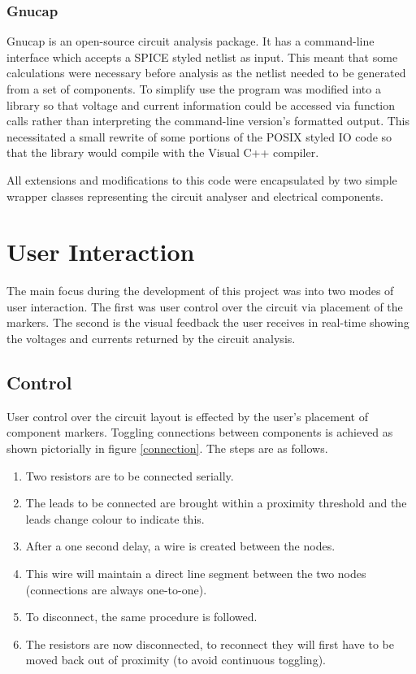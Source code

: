 \subsubsection{Gnucap}
Gnucap is an open-source circuit analysis package. It has a command-line
interface which accepts a SPICE styled netlist as input. This meant that some
calculations were necessary before analysis as the netlist needed to be generated
from a set of components. To simplify use the program was modified into a
library so that voltage and current information could be accessed via function
calls rather than interpreting the command-line version's formatted output. This
necessitated a small rewrite of some portions of the POSIX styled IO code so
that the library would compile with the Visual C++ compiler.

All extensions and modifications to this code were encapsulated by two simple
wrapper classes representing the circuit analyser and electrical components.

\section{User Interaction}
The main focus during the development of this project was into two modes of user
interaction. The first was user control over the circuit via placement of the
markers. The second is the visual feedback the user receives in real-time
showing the voltages and currents returned by the circuit analysis.

\subsection{Control}
User control over the circuit layout is effected by the user's placement of component
markers. Toggling connections between components is achieved as shown
pictorially in figure \ref{connection}. The steps are as follows.
\begin{enumerate}
\item Two resistors are to be connected serially.
\item The leads to be connected are brought within a proximity threshold and the
leads change colour to indicate this.
\item After a one second delay, a wire is created between the nodes.
\item This wire will maintain a direct line segment between the two nodes
(connections are always one-to-one).
\item To disconnect, the same procedure is followed.
\item The resistors are now disconnected, to reconnect they will first have to
be moved back out of proximity (to avoid continuous toggling).
\end{enumerate}

